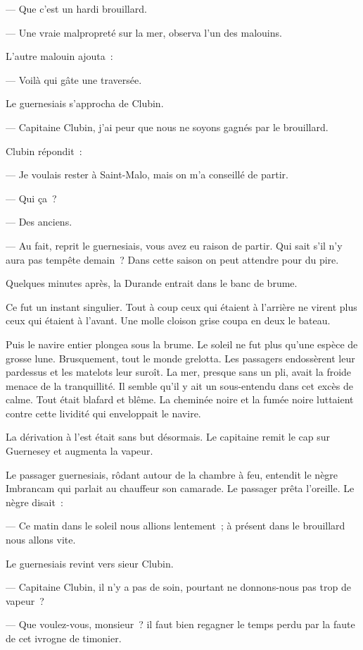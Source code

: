 \documentclass[french,twoside]{book} %
\begin{document}
— Que c’est un hardi brouillard.\par
— Une vraie malpropreté sur la mer, observa l’un des malouins.\par
L’autre malouin ajouta :\par
— Voilà qui gâte une traversée.\par
Le guernesiais s’approcha de Clubin.\par
— Capitaine Clubin, j’ai peur que nous ne soyons gagnés par le brouillard.\par
 Clubin répondit :\par
— Je voulais rester à Saint-Malo, mais on m’a conseillé de partir.\par
— Qui ça ?\par
— Des anciens.\par
— Au fait, reprit le guernesiais, vous avez eu raison de partir. Qui sait s’il n’y aura pas tempête demain ? Dans cette saison on peut attendre pour du pire.\par
Quelques minutes après, la Durande entrait dans le banc de brume.\par
Ce fut un instant singulier. Tout à coup ceux qui étaient à l’arrière ne virent plus ceux qui étaient à l’avant. Une molle cloison grise coupa en deux le bateau.\par
Puis le navire entier plongea sous la brume. Le soleil ne fut plus qu’une espèce de grosse lune. Brusquement, tout le monde grelotta. Les passagers endossèrent leur pardessus et les matelots leur suroît. La mer, presque sans un pli, avait la froide menace de la tranquillité. Il semble qu’il y ait un sous-entendu dans cet excès de calme. Tout était blafard et blême. La cheminée noire et la fumée noire luttaient contre cette lividité qui enveloppait le navire.\par
La dérivation à l’est était sans but désormais. Le capitaine remit le cap sur Guernesey et augmenta la vapeur.\par
Le passager guernesiais, rôdant autour de la chambre à feu, entendit le nègre Imbrancam qui parlait au chauffeur son camarade. Le passager prêta l’oreille. Le nègre disait :\par
 — Ce matin dans le soleil nous allions lentement ; à présent dans le brouillard nous allons vite.\par
Le guernesiais revint vers sieur Clubin.\par
— Capitaine Clubin, il n’y a pas de soin, pourtant ne donnons-nous pas trop de vapeur ?\par
— Que voulez-vous, monsieur ? il faut bien regagner le temps perdu par la faute de cet ivrogne de timonier.\par
\end{document}
